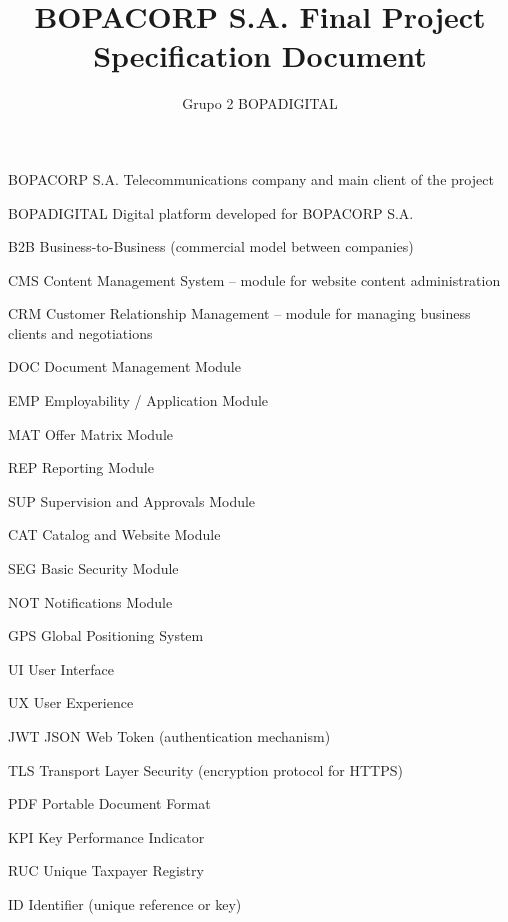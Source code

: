 \documentclass[letterpaper%
, oneside%
, 12pt%
, memoireprojet%
, english%
,creativecommons,hyperref, withAlgo2e %
]{thETS}
\title{BOPACORP S.A. Final Project Specification Document}
\author{Grupo 2 BOPADIGITAL}
\begin{document}

\maketitle

\presentjury

\tableofcontents

\listoftables

\listoffigures


\begin{listofabbr}[3cm]
\item [BOPACORP S.A.] Telecommunications company and main client of the project
\item [BOPADIGITAL] Digital platform developed for BOPACORP S.A.
\item [B2B] Business-to-Business (commercial model between companies)
\item [CMS] Content Management System – module for website content administration
\item [CRM] Customer Relationship Management – module for managing business clients and negotiations
\item [DOC] Document Management Module
\item [EMP] Employability / Application Module
\item [MAT] Offer Matrix Module
\item [REP] Reporting Module
\item [SUP] Supervision and Approvals Module
\item [CAT] Catalog and Website Module
\item [SEG] Basic Security Module
\item [NOT] Notifications Module
\item [GPS] Global Positioning System
\item [UI] User Interface
\item [UX] User Experience
\item [JWT] JSON Web Token (authentication mechanism)
\item [TLS] Transport Layer Security (encryption protocol for HTTPS)
\item [PDF] Portable Document Format
\item [KPI] Key Performance Indicator
\item [RUC] Unique Taxpayer Registry
\item [ID] Identifier (unique reference or key)
\end{listofabbr}
\end{document}
